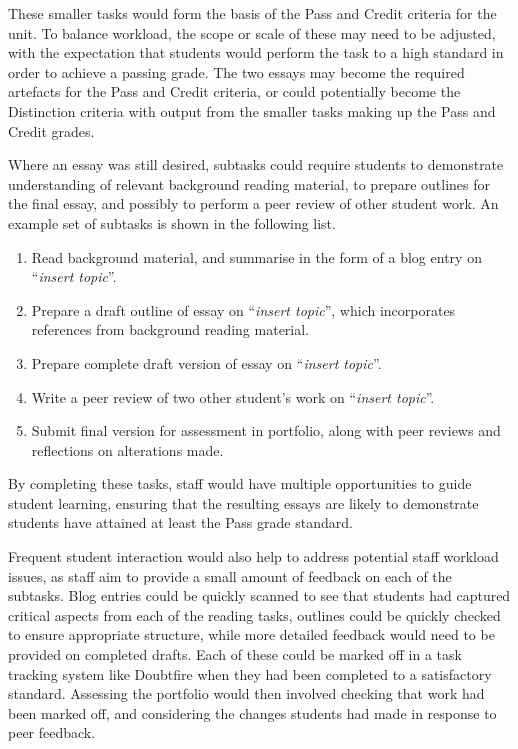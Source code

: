 These smaller tasks would form the basis of the Pass and Credit criteria for the unit. To balance workload, the scope or scale of these may need to be adjusted, with the expectation that students would perform the task to a high standard in order to achieve a passing grade. The two essays may become the required artefacts for the Pass and Credit criteria, or could potentially become the Distinction criteria with output from the smaller tasks making up the Pass and Credit grades.

Where an essay was still desired, subtasks could require students to demonstrate understanding of relevant background reading material, to prepare outlines for the final essay, and possibly to perform a peer review of other student work. An example set of subtasks is shown in the following list. 

\begin{enumerate}
	\item Read background material, and summarise in the form of a blog entry on ``\emph{insert topic}''.
	\item Prepare a draft outline of essay on ``\emph{insert topic}'', which incorporates references from background reading material.
	\item Prepare complete draft version of essay on ``\emph{insert topic}''.
	\item Write a peer review of two other student's work on ``\emph{insert topic}''. 
	\item Submit final version for assessment in portfolio, along with peer reviews and reflections on alterations made.
\end{enumerate}

By completing these tasks, staff would have multiple opportunities to guide student learning, ensuring that the resulting essays are likely to demonstrate students have attained at least the Pass grade standard. 

Frequent student interaction would also help to address potential staff workload issues, as staff aim to provide a small amount of feedback on each of the subtasks. Blog entries could be quickly scanned to see that students had captured critical aspects from each of the reading tasks, outlines could be quickly checked to ensure appropriate structure, while more detailed feedback would need to be provided on completed drafts. Each of these could be marked off in a task tracking system like Doubtfire when they had been completed to a satisfactory standard. Assessing the portfolio would then involved checking that work had been marked off, and considering the changes students had made in response to peer feedback.


